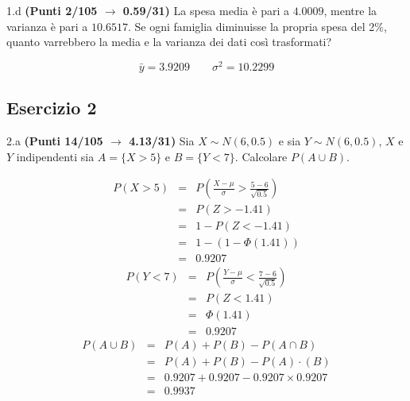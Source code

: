 \documentclass[
  11pt,
]{book}
\theoremstyle{mytheoremstyle}
\theoremstyle{mydefstyle}
\newenvironment{sol}
  {
  \begin{tcolorbox}[enhanced,breakable,arc=0.1mm,boxrule=1pt,colback=white,colframe=iblue,
  title=\bf \fontfamily{lmss}\selectfont \hspace{.5 cm} Soluzione,drop fuzzy shadow]

}{
\end{tcolorbox}
  }
\begin{document}
1.d \textbf{(Punti 2/105 \(\rightarrow\) 0.59/31)} La spesa media è pari a \(4.0009\), mentre la varianza è pari a \(10.6517\).
Se ogni famiglia diminuisse la propria spesa del 2\%, quanto varrebbero la media e la varianza dei dati così trasformati?

\begin{sol}
\[
\bar y = 3.9209\qquad \sigma^2 = 10.2299
\]

\end{sol}

\subsection{Esercizio 2}\label{esercizio-2-40}

2.a \textbf{(Punti 14/105 \(\rightarrow\) 4.13/31)} Sia \(X\sim N(6,0.5)\) e sia \(Y\sim N(6,0.5)\), \(X\) e \(Y\) indipendenti sia \(A=\{X>5\}\) e \(B=\{Y<7\}\).
Calcolare \(P(A\cup B)\).

\begin{sol}
\begin{eqnarray*}
      P( X   >   5 ) 
        &=& P\left(  \frac { X  -  \mu }{ \sigma }  >  \frac { 5  -  6 }{\sqrt{ 0.5 }} \right)  \\
                 &=& P\left(  Z   >   -1.41 \right) \\    &=& 1-P(Z< -1.41 )\\ 
                 &=&  1-(1-\Phi( 1.41 )) \\ &=&  0.9207 
      \end{eqnarray*}\begin{eqnarray*}
      P( Y   <   7 ) 
        &=& P\left(  \frac { Y  -  \mu }{ \sigma }  <  \frac { 7  -  6 }{\sqrt{ 0.5 }} \right)  \\
                 &=& P\left(  Z   <   1.41 \right) \\    
                 &=&  \Phi( 1.41 ) \\ &=&  0.9207 
      \end{eqnarray*}\begin{eqnarray}
      P( A \cup B ) &=& P( A )+P( B )-P( A \cap B ) \\
                         &=& P( A )+P( B )-P( A )\cdot ( B ) \\
                         &=&  0.9207 + 0.9207 - 0.9207 \times 0.9207  \\
                         &=&  0.9937 \end{eqnarray}

\end{sol}
\end{document}
